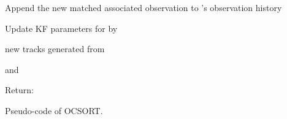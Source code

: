 \documentclass[10pt,twocolumn,letterpaper]{article}
\begin{document}
\begin{algorithm*}
{{	    
        Append the new matched associated observation  to 's observation history
        
        Update KF parameters for  by 
	}
	
	\BlankLine	
	\BlankLine
	
     new tracks generated from 
    
    
       and   
    
}

 
Return: 
\caption{Pseudo-code of OCSORT.}
\label{algo:ocsort}
\end{algorithm*}
\end{document}
